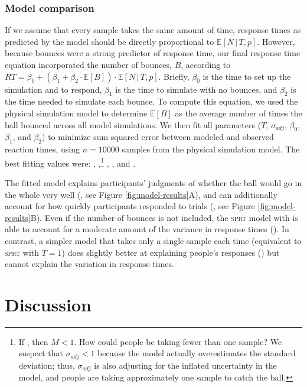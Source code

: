\documentclass[10pt,letterpaper]{article}
\begin{document}
\subsubsection{Model comparison}

If we assume that every sample takes the same amount of time, response times as predicted by the model should be directly proportional to $\mathbb{E}[N\,|\,T,p]$.
However, because bounces were a strong predictor of response time, our final response time equation incorporated the number of bounces, $B$, according to $RT = \beta_0 + (\beta_1 + \beta_2\cdot{}\mathbb{E}[B]) \cdot{}\mathbb{E}[N\,|\,T,p]$.
Briefly, $\beta_0$ is the time to set up the simulation and to respond, $\beta_1$ is the time to simulate with no bounces, and $\beta_2$ is the time needed to simulate each bounce.
To compute this equation, we used the physical simulation model to determine $\mathbb{E}[B]$ as the average number of times the ball bounced across all model simulations.
We then fit all parameters ($T$, $\sigma_{adj}$, $\beta_0$, $\beta_1$, and $\beta_2$) to minimize sum squared error between modeled and observed reaction times, using $n=10000$ samples from the physical simulation model.
The best fitting values were: \threshold{}, \sdadj{},\footnote{If \sdadj{}, then $M<1$. How could people be taking fewer than one sample?
We suspect that $\sigma_{adj}<1$ because the model actually overestimates the standard deviation; thus, $\sigma_{adj}$ is also adjusting for the inflated uncertainty in the model, and people are taking approximately one sample to catch the ball.} \betazero{}, \betaone{}, and \betatwo{}.

The fitted model explains participants' judgments of whether the ball would go in the whole very well (\HoleResponseCorr{}, see Figure \ref{fig:model-results}A), and can additionally account for how quickly participants responded to trials (\HoleRTCorr{}, see Figure \ref{fig:model-results}B).
Even if the number of bounces is not included, the \textsc{sprt} model with \threshold{} is able to account for a moderate amount of the variance in response times (\NoBouncesHoleRTCorr{}).
In contrast, a simpler model that takes only a single sample each time (equivalent to \textsc{sprt} with $T=1$) does slightly better at explaining people's responses (\RawHoleResponseCorr{}) but cannot explain the variation in response times.

\section{Discussion}
\end{document}
